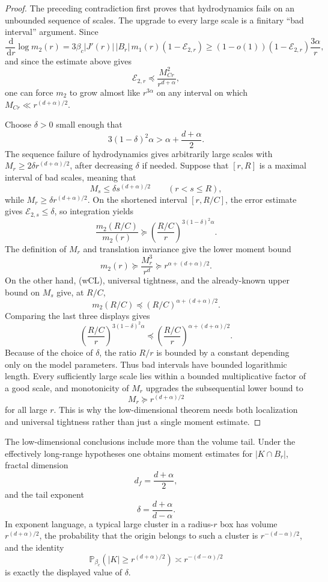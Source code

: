\documentclass[11pt,reqno]{book}
\numberwithin{equation}{chapter}
\theoremstyle{plain}
\theoremstyle{definition}
\theoremstyle{remark}
\newcommand{\1}{\mathbf 1}
\newcommand{\dd}{\,\mathrm d}
\newcommand{\pre}{\preceq}
\newcommand{\suc}{\succeq}
\begin{document}
\begin{proof}
The preceding contradiction first proves that hydrodynamics fails on an
unbounded sequence of scales. The upgrade to every large scale is a finitary
``bad interval'' argument. Since
\[
  \frac{\dd}{\dd r}\log m_2(r)
  =
  3\beta_c |J'(r)|\,|B_r|\,m_1(r)(1-\mathcal E_{2,r})
  \geq
  (1-o(1))(1-\mathcal E_{2,r})\frac{3\alpha}{r},
\]
and since the estimate above gives
\[
  \mathcal E_{2,r}
  \pre
  \frac{M_{Cr}^2}{r^{d+\alpha}},
\]
one can force \(m_2\) to grow almost like \(r^{3\alpha}\) on any interval on
which \(M_{Cr}\ll r^{(d+\alpha)/2}\).

Choose \(\delta>0\) small enough that
\[
  3(1-\delta)^2\alpha>\alpha+\frac{d+\alpha}{2}.
\]
The sequence failure of hydrodynamics gives arbitrarily large scales with
\(M_r\geq 2\delta r^{(d+\alpha)/2}\), after decreasing \(\delta\) if needed.
Suppose that \([r,R]\) is a maximal interval of bad scales, meaning that
\[
  M_s\leq \delta s^{(d+\alpha)/2}
  \qquad (r<s\leq R),
\]
while \(M_r\geq\delta r^{(d+\alpha)/2}\). On the shortened interval
\([r,R/C]\), the error estimate gives \(\mathcal E_{2,s}\leq \delta\), so
integration yields
\[
  \frac{m_2(R/C)}{m_2(r)}
  \suc
  \left(\frac{R/C}{r}\right)^{3(1-\delta)^2\alpha}.
\]
The definition of \(M_r\) and translation invariance give the lower moment
bound
\[
  m_2(r)\suc \frac{M_r^3}{r^d}
  \suc
  r^{\alpha+(d+\alpha)/2}.
\]
On the other hand, (wCL), universal tightness, and the already-known upper
bound on \(M_s\) give, at \(R/C\),
\[
  m_2(R/C)\pre (R/C)^{\alpha+(d+\alpha)/2}.
\]
Comparing the last three displays gives
\[
  \left(\frac{R/C}{r}\right)^{3(1-\delta)^2\alpha}
  \pre
  \left(\frac{R/C}{r}\right)^{\alpha+(d+\alpha)/2}.
\]
Because of the choice of \(\delta\), the ratio \(R/r\) is bounded by a
constant depending only on the model parameters. Thus bad intervals have
bounded logarithmic length. Every sufficiently large scale lies within a
bounded multiplicative factor of a good scale, and monotonicity of \(M_r\)
upgrades the subsequential lower bound to
\[
  M_r\suc r^{(d+\alpha)/2}
\]
for all large \(r\). This is why the low-dimensional theorem needs both
localization and universal tightness rather than just a single moment
estimate.
\end{proof}

The low-dimensional conclusions include more than the volume tail. Under the effectively long-range hypotheses one obtains moment estimates for $|K\cap B_r|$, fractal dimension
\[
  d_f=\frac{d+\alpha}{2},
\]
and the tail exponent
\[
  \delta=\frac{d+\alpha}{d-\alpha}.
\]
In exponent language, a typical large cluster in a radius-$r$ box has volume $r^{(d+\alpha)/2}$, the probability that the origin belongs to such a cluster is $r^{-(d-\alpha)/2}$, and the identity
\[
  \mathbb P_{\beta_c}(|K|\geq r^{(d+\alpha)/2})
  \asymp r^{-(d-\alpha)/2}
\]
is exactly the displayed value of $\delta$.
\end{document}
